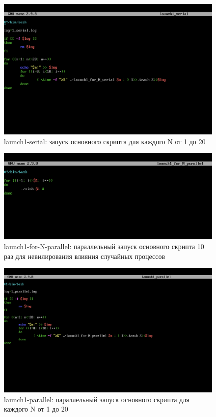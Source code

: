 \documentclass{article}
\begin{document}
\begin{figure}[H]
\centering
\includegraphics[width=1\textwidth]{images/4.png}
\caption{launch1-serial: запуск основного скрипта для каждого N от 1 до 20}
\end{figure}

\begin{figure}[H]
\centering
\includegraphics[width=1\textwidth]{images/7.png}
\caption{launch1-for-N-parallel: параллельный запуск основного скрипта 10 раз для невилирования влияния случайных процессов}
\end{figure}

\begin{figure}[H]
\centering
\includegraphics[width=1\textwidth]{images/8.png}
\caption{launch1-parallel: параллельный запуск основного скрипта для каждого N от 1 до 20}
\end{figure}
\end{document}
